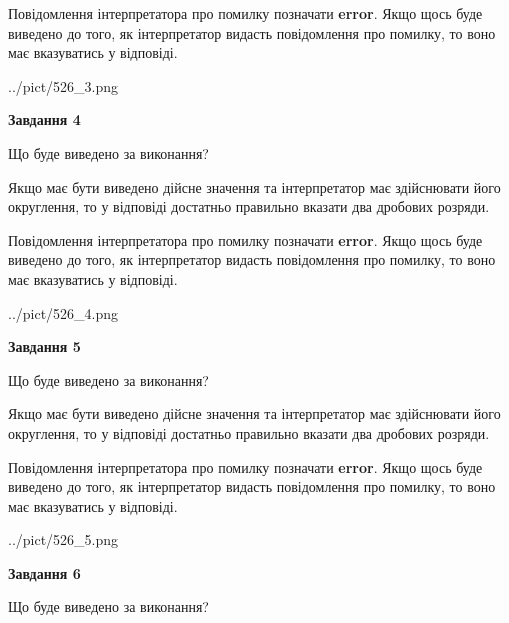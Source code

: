 \documentclass[12pt, ukrainian]{article}
\begin{document}
{\begin {Large}
Повідомлення інтерпретатора про помилку позначати \textbf{error}.
Якщо щось буде виведено до того, як інтерпретатор видасть повідомлення про помилку, 
то воно має вказуватись у відповіді. \par

\begin{center}
	{../pict/526_3.png}
\end{center}
\newpage

{\begin {center}\textbf{Завдання 4}\end {center}}\par
Що буде виведено за виконання? \par

Якщо має бути виведено дійсне значення та інтерпретатор має здійснювати його округлення, 
то у відповіді достатньо правильно вказати два дробових розряди.

Повідомлення інтерпретатора про помилку позначати \textbf{error}.
Якщо щось буде виведено до того, як інтерпретатор видасть повідомлення про помилку, 
то воно має вказуватись у відповіді. \par

\begin{center}
	{../pict/526_4.png}
\end{center}
\newpage

{\begin {center}\textbf{Завдання 5}\end {center}}\par
Що буде виведено за виконання? \par

Якщо має бути виведено дійсне значення та інтерпретатор має здійснювати його округлення, 
то у відповіді достатньо правильно вказати два дробових розряди.

Повідомлення інтерпретатора про помилку позначати \textbf{error}.
Якщо щось буде виведено до того, як інтерпретатор видасть повідомлення про помилку, 
то воно має вказуватись у відповіді. \par

\begin{center}
	{../pict/526_5.png}
\end{center}
\newpage

{\begin {center}\textbf{Завдання 6}\end {center}}\par
Що буде виведено за виконання? \par


\end{Large}}
\end{document}
